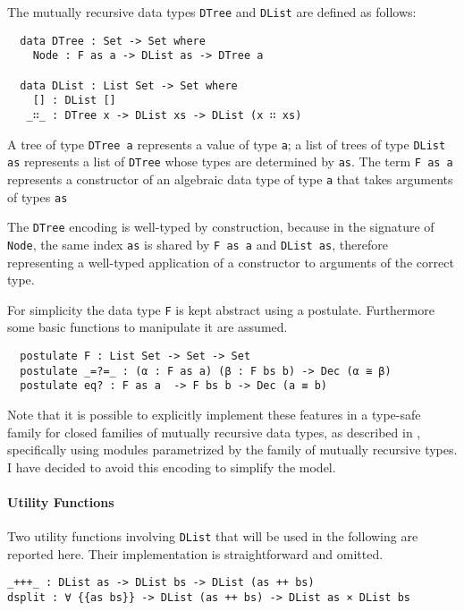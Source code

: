 \documentclass[../Thesis.tex]{subfiles}
\begin{document}
		The mutually recursive data types \texttt{DTree} and \texttt{DList} are
		defined as follows: 
					
\begin{verbatim}
  data DTree : Set -> Set where
    Node : F as a -> DList as -> DTree a

  data DList : List Set -> Set where
    [] : DList []
   _∷_ : DTree x -> DList xs -> DList (x ∷ xs)
\end{verbatim}
	
		A tree of type \texttt{DTree a} represents a value of type \texttt{a}; 
		a list of trees of type \texttt{DList as} represents a list of 
		\texttt{DTree} whose types are determined by \texttt{as}.
		The term \texttt{F as a} represents a constructor of an algebraic data
		type of type \texttt{a} that takes arguments of types \texttt{as} 

		The \texttt{DTree} encoding is well-typed by construction, because 
		in the signature of \texttt{Node}, the same index \texttt{as}
		is shared by \texttt{F as a} and \texttt{DList as}, therefore  
		representing a well-typed application of a constructor to arguments of 
		the correct type.
						
		For simplicity the data type \texttt{F} is kept abstract using a postulate. 
		Furthermore some basic functions to manipulate it are assumed.
		
\begin{verbatim}
  postulate F : List Set -> Set -> Set 
  postulate _=?=_ : (α : F as a) (β : F bs b) -> Dec (α ≅ β)
  postulate eq? : F as a  -> F bs b -> Dec (a ≡ b)
\end{verbatim}

	Note that it is possible to explicitly implement these features in a 
	type-safe family for closed families of mutually recursive data types, 
	as described in \cite{Lemp09}, specifically using modules parametrized
	by the family of mutually recursive types. 
	I have decided to avoid this encoding to simplify the model.
	
	\paragraph{Utility Functions}
	Two utility functions involving \texttt{DList} that will be used in the 
	following are reported here.
	Their implementation is straightforward and omitted.

\begin{verbatim}
_+++_ : DList as -> DList bs -> DList (as ++ bs)
dsplit : ∀ {{as bs}} -> DList (as ++ bs) -> DList as × DList bs
\end{verbatim}
	
\end{document}
